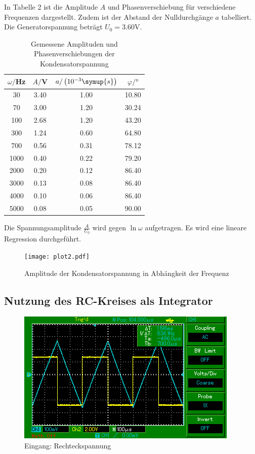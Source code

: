 In Tabelle 2 ist die Amplitude $A$ und Phasenverschiebung für verschiedene Frequenzen dargestellt. Zudem ist der
Abstand der Nulldurchgänge $a$ tabelliert. Die Generatorspannung beträgt $U_0 = 3.60$V.

\begin{table}[H]
  \centering
  \caption{Gemessene Amplituden und Phasenverschiebungen der Kondensatorspannung}
  \label{tab:amplitude}
  \begin{tabular}{c c c c}
    \toprule
    $\omega/$Hz & $A/$V & $a/\left(10^{-3}\symup{s}\right)$ & $\varphi /°$ \\
    \midrule
    30   &  3.40 &    1.00 &  10.80 \\
    70   &  3.00 &    1.20 &  30.24 \\
    100  &  2.68 &    1.20 &  43.20 \\
    300  &  1.24 &    0.60 &  64.80 \\
    700  &  0.56 &    0.31 &  78.12 \\
    1000 &  0.40 &    0.22 &  79.20 \\
    2000 &  0.20 &    0.12 &  86.40 \\
    3000 &  0.13 &    0.08 &  86.40 \\
    4000 &  0.10 &    0.06 &  86.40 \\
    5000 &  0.08 &    0.05 &  90.00 \\
    \bottomrule
  \end{tabular}
\end{table}

Die Spannungsamplitude $\frac{A}{U_0}$ wird gegen $\ln{\omega}$ aufgetragen. Es wird eine lineare
Regression durchgeführt.

\begin{figure}[H]
  \centering
  \texttt{[image: plot2.pdf]}
  \caption{Amplitude der Kondensatorspannung in Abhängkeit der Frequenz}
  \label{fig:amplitude}
\end{figure}


\subsection{Nutzung des RC-Kreises als Integrator}

\begin{figure}[H]
  \centering
  \includegraphics{MAP001.png}
  \caption{Eingang: Rechteckspannung}
  \label{fig:Rechteckspannung}
\end{figure}

